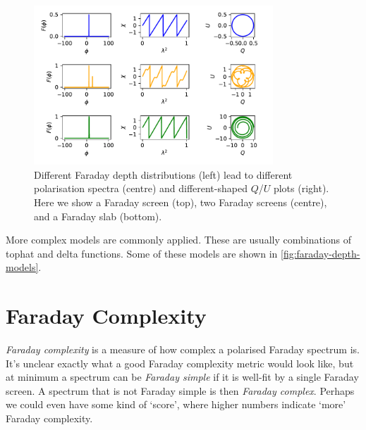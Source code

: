 \documentclass[a4paper]{article}
\newcommand{\defn}[1]{\emph{#1}}
\begin{document}
    \begin{figure}
        \centering
        \includegraphics[width=0.8\textwidth]{faraday-depth.pdf}
        \caption{Different Faraday depth distributions (left) lead to different polarisation spectra (centre) and different-shaped $Q$/$U$ plots (right). Here we show a Faraday screen (top), two Faraday screens (centre), and a Faraday slab (bottom). \label{fig:faraday-depth-models}}
    \end{figure}

    More complex models are commonly applied. These are usually combinations of tophat and delta functions. Some of these models are shown in \autoref{fig:faraday-depth-models}.

    \section{Faraday Complexity}

    \defn{Faraday complexity} is a measure of how complex a polarised Faraday spectrum is. It's unclear exactly what a good Faraday complexity metric would look like, but at minimum a spectrum can be \defn{Faraday simple} if it is well-fit by a single Faraday screen. A spectrum that is not Faraday simple is then \defn{Faraday complex}. Perhaps we could even have some kind of `score', where higher numbers indicate `more' Faraday complexity.

    
\end{document}
